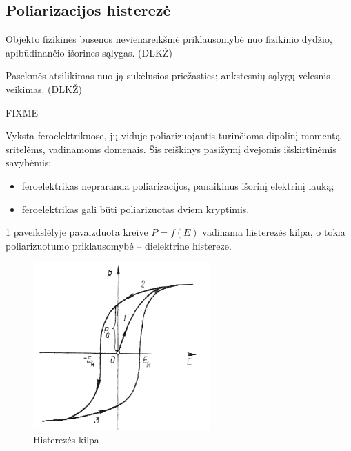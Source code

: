 \subsection{Poliarizacijos histerezė}

\begin{defn}[Histerezė]
  Objekto fizikinės būsenos nevienareikšmė priklausomybė nuo fizikinio
  dydžio, apibūdinančio išorines sąlygas. (DLKŽ)
\end{defn}

\begin{defn}[Histerezė]
  Pasekmės atsilikimas nuo ją sukėlusios priežasties; ankstesnių sąlygų
  vėlesnis veikimas. (DLKŽ)
\end{defn}

\begin{defn}
  FIXME

  Vyksta feroelektrikuose, jų viduje poliarizuojantis turinčioms dipolinį
  momentą sritelėms, vadinamoms domenais. Šis reiškinys pasižymį
  dvejomis išskirtinėmis savybėmis:
  \begin{itemize}
    \item feroelektrikas nepraranda poliarizacijos, panaikinus išorinį
      elektrinį lauką;
    \item feroelektrikas gali būti poliarizuotas dviem kryptimis.
  \end{itemize}
  \ref{fig:histereze} paveikslėlyje pavaizduota kreivė $P = f(E)$ vadinama 
  histerezės kilpa, o tokia poliarizuotumo priklausomybė – dielektrine
  histereze.
\end{defn}

\begin{figure}[H]
  \begin{center}
    \includegraphics[height=0.5\textwidth]{images/histereze.png}
  \end{center}
  \caption{Histerezės kilpa}
  \label{fig:histereze}
\end{figure}

